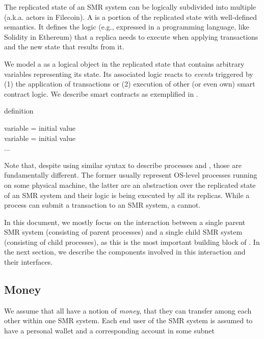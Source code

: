 The replicated state of an SMR system can be logically subdivided into multiple \emph{\dapps} (a.k.a. actors in Filecoin).
A \dapp is a portion of the replicated state with well-defined semantics.
It defines the logic (e.g., expressed in a programming language, like Solidity in Ethereum)
that a replica needs to execute when applying transactions and the new state that results from it.

We model a \dapp as a logical object in the replicated state that contains arbitrary variables representing its state.
Its associated logic reacts to \emph{events} triggered by (1) the application of transactions or (2) execution of other (or even own) smart contract logic. We describe smart contracts as exemplified in .

\begin{algorithm}[H]
\footnotesize
\caption{\dapp definition}\label{alg:dapp-definition}
  \DontPrintSemicolon
  variable = initial value\\
  variable = initial value\\
  ...\\
\end{algorithm}
Note that, despite using similar syntax to describe processes and \dapps, those are fundamentally different.
The former usually represent OS-level processes running on some physical machine,
the latter are an abstraction over the replicated state of an SMR system and their logic is being executed by all its replicas.
While a process can submit a transaction to an SMR system, a \dapp cannot.

In this document, we mostly focus on the interaction between a single parent SMR system (consisting of parent processes) and a single child SMR system (consisting of child processes), as this is the most important building block of \ipc.
In the next section, we describe the components involved in this interaction and their interfaces.

\subsection{Money}

We assume that all \dapps have a notion of \emph{money}, that they can transfer among each other within one SMR system.
Each end user of the SMR system is assumed to have a personal wallet and a corresponding account in some subnet
